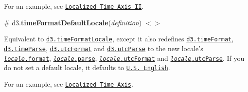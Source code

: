 For an example, see \href{https://bl.ocks.org/mbostock/805115ebaa574e771db1875a6d828949}{\tt Localized Time Axis II}.

\label{_timeFormatDefaultLocale}%
\# d3.{\bfseries time\+Format\+Default\+Locale}({\itshape definition}) \href{https://github.com/d3/d3-time-format/blob/master/src/defaultLocale.js}{\tt $<$$>$}

Equivalent to \href{#timeFormatLocale}{\tt d3.\+time\+Format\+Locale}, except it also redefines \href{#timeFormat}{\tt d3.\+time\+Format}, \href{#timeParse}{\tt d3.\+time\+Parse}, \href{#utcFormat}{\tt d3.\+utc\+Format} and \href{#utcParse}{\tt d3.\+utc\+Parse} to the new locale’s \href{#locale_format}{\tt {\itshape locale}.format}, \href{#locale_parse}{\tt {\itshape locale}.parse}, \href{#locale_utcFormat}{\tt {\itshape locale}.utc\+Format} and \href{#locale_utcParse}{\tt {\itshape locale}.utc\+Parse}. If you do not set a default locale, it defaults to \href{https://github.com/d3/d3-time-format/blob/master/locale/en-US.json}{\tt U.\+S. English}.

For an example, see \href{https://bl.ocks.org/mbostock/6f1cc065d4d172bcaf322e399aa8d62f}{\tt Localized Time Axis}. 